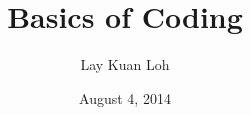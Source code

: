 \documentclass[letterpaper,10pt]{article}
\begin{document}

\title{Basics of Coding}
\date{August 4, 2014}
\author{Lay Kuan Loh}
\maketitle

\section{}
\end{document}
